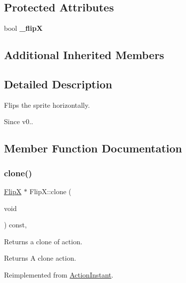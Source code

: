 \subsection*{Protected Attributes}
\begin{DoxyCompactItemize}
\item 
\mbox{\label{classFlipX_a0cc7e97771277e1045a24be4b0720bfb}} 
bool {\bfseries \+\_\+flipX}
\end{DoxyCompactItemize}
\subsection*{Additional Inherited Members}


\subsection{Detailed Description}
Flips the sprite horizontally. 

\begin{DoxySince}{Since}
v0.. 
\end{DoxySince}


\subsection{Member Function Documentation}
\mbox{\label{classFlipX_aa610da08d03c31d45ceceb5bb0795719}} 
\subsubsection{\texorpdfstring{clone()}{clone()}\hspace{0.1cm}{\footnotesize\ttfamily [1/2]}}
{\footnotesize\ttfamily \hyperlink{classFlipX}{FlipX} $\ast$ Flip\+X\+::clone (\begin{DoxyParamCaption}\item[{void}]{ }\end{DoxyParamCaption}) const\hspace{0.3cm}{\ttfamily [override]}, {\ttfamily [virtual]}}

Returns a clone of action.

\begin{DoxyReturn}{Returns}
A clone action. 
\end{DoxyReturn}


Reimplemented from \hyperlink{classActionInstant_adb76fc6f006098109e8256210cbd8cc0}{Action\+Instant}.

